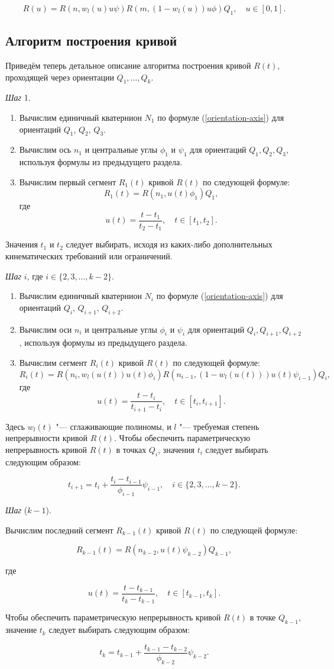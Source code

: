 $$
R(u)=R(n,w_l(u)u\psi)R(m,(1-w_l(u))u\phi)Q_1, \quad u \in [0,1].
$$

\subsection*{Алгоритм построения кривой}

Приведём теперь детальное описание алгоритма построения кривой $R(t)$, проходящей через ориентации $Q_1,\dots,Q_k$.

\bigskip
\textit{Шаг} 1.

\begin{enumerate}
\item Вычислим единичный кватернион $N_1$ по формуле (\ref{orientation-axis}) для ориентаций $Q_1$, $Q_2$, $Q_3$.
\item Вычислим ось $n_1$ и центральные углы $\phi_1$ и $\psi_1$ для ориентаций $Q_1,Q_2,Q_3$, используя формулы из
предыдущего раздела.
\item Вычислим первый сегмент $R_1(t)$ кривой $R(t)$ по следующей формуле:
$$
R_1(t)=R(n_1,u(t)\phi_1)Q_1,
$$
\noindent где
$$
u(t)=\frac{t-t_1}{t_2-t_1}, \quad t \in [t_1,t_2].
$$
\end{enumerate}

Значения $t_1$ и $t_2$ следует выбирать, исходя из каких-либо дополнительных кинематических требований или ограничений.

\bigskip
\textit{Шаг} $i$, где $i \in \{2,3,\dots,k-2\}$.

\begin{enumerate}
\item Вычислим единичный кватернион $N_i$ по формуле (\ref{orientation-axis}) для ориентаций $Q_i$, $Q_{i+1}$,
$Q_{i+2}$.
\item Вычислим оси $n_i$ и центральные углы $\phi_i$ и $\psi_i$ для ориентаций $Q_i, Q_{i+1}, Q_{i+2}$, используя
формулы из предыдущего раздела.
\item Вычислим сегмент $R_i(t)$ кривой $R(t)$ по следующей формуле:
$$
R_i(t)=R(n_i,w_l(u(t))u(t)\phi_i)R(n_{i-1},(1-w_l(u(t)))u(t)\psi_{i-1})Q_i,
$$
\noindent где
$$
u(t)=\frac{t-t_i}{t_{i+1}-t_i}, \quad t \in [t_i,t_{i+1}].
$$
\end{enumerate}

Здесь $w_l(t)$ "--- сглаживающие полиномы, и $l$ "--- требуемая степень непрерывности кривой $R(t)$. Чтобы обеспечить
параметрическую непрерывность кривой $R(t)$ в точках $Q_i$, значения $t_i$ следует выбирать следующим образом:

$$
t_{i+1}=t_i+\frac{t_i-t_{i-1}}{\phi_{i-1}}\psi_{i-1}, \quad i \in \{2,3,\dots,k-2\}.
$$

\bigskip
\textit{Шаг} ($k-1$).

Вычислим последний сегмент $R_{k-1}(t)$ кривой $R(t)$ по следующей формуле:

$$
R_{k-1}(t)=R(n_{k-2},u(t)\psi_{k-2})Q_{k-1},
$$

\noindent где

$$
u(t)=\frac{t-t_{k-1}}{t_k-t_{k-1}}, \quad t \in [t_{k-1},t_k].
$$

Чтобы обеспечить параметрическую непрерывность кривой $R(t)$ в точке $Q_{k-1}$, значение $t_k$ следует выбирать
следующим образом:

$$
t_k=t_{k-1}+\frac{t_{k-1}-t_{k-2}}{\phi_{k-2}}\psi_{k-2}.
$$
